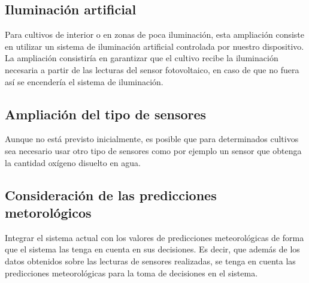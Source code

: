 \documentclass[12pt,a4paper,titlepage,oneside]{report}
\begin{document}
	\subsection*{Iluminación artificial}
	Para cultivos de interior o en zonas de poca iluminación, esta ampliación consiste en utilizar un sistema de iluminación artificial controlada por nuestro dispositivo. La ampliación consistiría en garantizar que el cultivo recibe la iluminación necesaria a partir de las lecturas del sensor fotovoltaico, en caso de que no fuera así se encendería el sistema de iluminación.


	\subsection*{Ampliación del tipo de sensores}
	Aunque no está previsto inicialmente, es posible que para determinados cultivos sea necesario usar otro tipo de sensores como por ejemplo un sensor que obtenga la cantidad oxígeno disuelto en agua.

	\subsection*{Consideración de las predicciones metorológicos}
	Integrar el sistema actual con los valores de predicciones meteorológicas de forma que el sistema las tenga en cuenta en sus decisiones. Es decir, que además de los datos obtenidos sobre las lecturas de sensores realizadas, se tenga en cuenta las predicciones meteorológicas para la toma de decisiones en el sistema.
	
\newpage
{}


\end{document}
